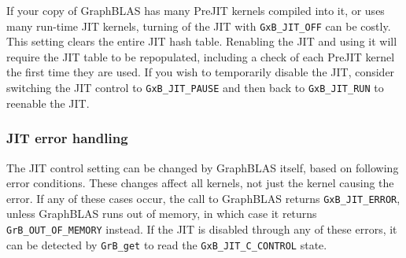 \documentclass[12pt]{article}
\begin{document}
If your copy of GraphBLAS has many PreJIT kernels compiled into it, or uses
many run-time JIT kernels, turning of the JIT with \verb'GxB_JIT_OFF' can be
costly.  This setting clears the entire JIT hash table.  Renabling the JIT and
using it will require the JIT table to be repopulated, including a check of
each PreJIT kernel the first time they are used.  If you wish to temporarily
disable the JIT, consider switching the JIT control to \verb'GxB_JIT_PAUSE' and
then back to \verb'GxB_JIT_RUN' to reenable the JIT.

\subsubsection{JIT error handling}

The JIT control setting can be changed by GraphBLAS itself, based on
following error conditions.  These changes affect all kernels, not just the
kernel causing the error.  If any of these cases occur, the call to GraphBLAS
returns \verb'GxB_JIT_ERROR', unless GraphBLAS runs out of memory, in which
case it returns \verb'GrB_OUT_OF_MEMORY' instead.  If the JIT is disabled
through any of these errors, it can be detected by \verb'GrB_get' to read the
\verb'GxB_JIT_C_CONTROL' state.
\end{document}

